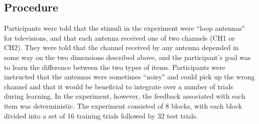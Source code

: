 \documentclass[3p,twocolumn,authoryear,10pt]{elsarticle}
\begin{document}


\subsection{Procedure}
Participants were told that the stimuli in the experiment were ``loop antennas" for televisions, and that each antenna received one of two channels (CH1 or CH2). They were told that the channel received by any antenna depended in some way on the two dimensions described above, and the participant's goal was to learn the difference between the two types of items. Participants were instructed that the antennas were sometimes ``noisy" and could pick up the wrong channel and that it would be beneficial to integrate over a number of trials during learning. In the experiment, however, the feedback associated with each item was deterministic. The experiment consisted of 8 blocks, with each block divided into a set of 16 training trials followed by 32 test trials. \\
\end{document}
